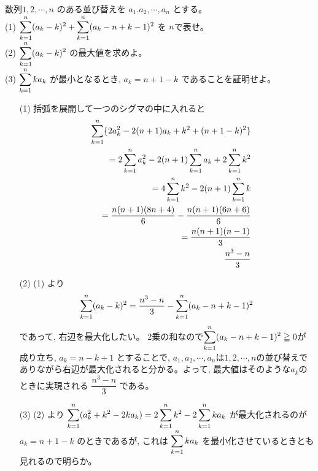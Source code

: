 数列$1,2,\cdots, n$ のある並び替えを $a_1.a_2,\cdots , a_n$ とする。\\
(1) $\displaystyle\sum_{k=1}^n (a_k-k)^2 + \displaystyle\sum_{k=1}^n (a_k-n+k-1)^2$ を $n$で表せ。\\
(2) $\displaystyle\sum_{k=1}^n(a_k-k)^2$ の最大値を求めよ。\\
(3) $\displaystyle\sum_{k=1}^nka_k$ が最小となるとき, $a_k=n+1-k$ であることを証明せよ。
\enthm
\begin{enumerate}
\item[(1)] 括弧を展開して一つのシグマの中に入れると 
\begin{eqnarray*}
&&\displaystyle\sum_{k=1}^n \{2a_k^2-2(n+1)a_k + k^2 + (n+1-k)^2 \}\\
&&=2\displaystyle\sum_{k=1}^na_k^2 -2(n+1)\displaystyle\sum_{k=1}^na_k + 2\displaystyle\sum_{k=1}^n k^2\\
&&=4\displaystyle\sum_{k=1}^nk^2 - 2(n+1) \displaystyle\sum_{k=1}^nk\\
&&=\dfrac{n(n+1)(8n+4)}{6} - \dfrac{n(n+1)(6n+6)}{6}\\
&&=\dfrac{n(n+1)(n-1)}{3}\\
&&\dfrac{n^3-n}{3}
\end{eqnarray*}
\item[(2)] (1) より
\[\displaystyle\sum_{k=1}^n(a_k-k)^2 = \dfrac{n^3-n}{3}-\displaystyle\sum_{k=1}^n (a_k-n+k-1)^2\]
であって, 右辺を最大化したい。 2乗の和なので$\displaystyle\sum_{k=1}^n (a_k-n+k-1)^2\geqq 0$が成り立ち, $a_k=n-k+1$ とすることで, $a_1,a_2,\cdots, a_n$は$1,2,\cdots ,n$の並び替えでありながら右辺が最大化されると分かる。よって, 最大値はそのような$a_k$のときに実現される $\dfrac{n^3-n}{3}$ である。
\item[(3)] (2) より $\displaystyle\sum_{k=1}^n (a_k^2+k^2 -2ka_k)=2\displaystyle\sum_{k=1}^n k^2 -2\displaystyle\sum_{k=1}^n ka_k$ が最大化されるのが $a_k=n+1-k$ のときであるが, これは $\displaystyle\sum_{k=1}^n ka_k$ を最小化させているときとも見れるので明らか。
\end{enumerate}
